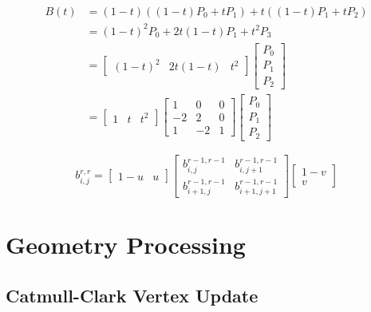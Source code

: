 \documentclass[10pt,landscape]{article}
\begin{document}
\begin{multicols}{3}
\begin{align*}
    B(t) &= (1-t)((1-t)P_0 + tP_1) + t((1-t)P_1 + tP_2) \\
    &= (1-t)^2 P_0 + 2t(1-t)P_1 + t^2 P_3 \\
    &=  \begin{bmatrix}
            (1-t)^2 & 2t(1-t) & t^2
        \end{bmatrix}
        \begin{bmatrix}
            P_0 \\
            P_1 \\
            P_2
        \end{bmatrix} \\
    &=  \begin{bmatrix}
            1 & t & t^2
        \end{bmatrix}
        \begin{bmatrix}
            1 & 0 & 0 \\
            -2 & 2 & 0 \\
            1 & -2 & 1
        \end{bmatrix}
        \begin{bmatrix}
            P_0 \\
            P_1 \\
            P_2
        \end{bmatrix}
\end{align*}

$$b_{i,j}^{r,r} =
\begin{bmatrix}
    1 - u & u
\end{bmatrix}
\begin{bmatrix}
    b_{i, j}^{r-1, r-1} & b_{i, j+1}^{r-1, r-1} \\
    b_{i+1, j}^{r-1, r-1} & b_{i+1, j+1}^{r-1, r-1}
\end{bmatrix}
\begin{bmatrix}
    1 - v \\
    v
\end{bmatrix}$$


\section{Geometry Processing}

\subsection{Catmull-Clark Vertex Update}


\end{multicols}
\end{document}
